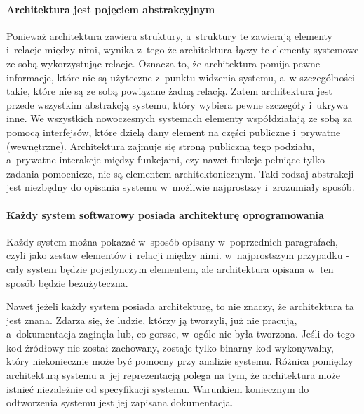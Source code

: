\paragraph{Architektura jest pojęciem abstrakcyjnym}
Ponieważ architektura zawiera struktury, a~struktury te zawierają elementy i~relacje między nimi, wynika z~tego że architektura łączy te elementy systemowe ze sobą wykorzystując relacje. Oznacza to, że architektura pomija pewne informacje, które nie są użyteczne z~punktu widzenia systemu, a~w szczególności takie, które nie są ze sobą powiązane żadną relacją. Zatem architektura jest przede wszystkim abstrakcją systemu, który wybiera pewne szczegóły i~ukrywa inne. We wszystkich nowoczesnych systemach elementy współdziałają ze sobą za pomocą interfejsów, które dzielą dany element na części publiczne i~prywatne (wewnętrzne). Architektura zajmuje się stroną publiczną tego podziału, a~prywatne interakcje między funkcjami, czy nawet funkcje pełniące tylko zadania pomocnicze, nie są elementem architektonicznym. Taki rodzaj abstrakcji jest niezbędny do opisania systemu w~możliwie najprostszy i~zrozumiały sposób.

\paragraph{Każdy system softwarowy posiada architekturę oprogramowania}
Każdy system można pokazać w~sposób opisany w~poprzednich paragrafach, czyli jako zestaw elementów i~relacji między nimi. w~najprostszym przypadku - cały system będzie pojedynczym elementem, ale architektura opisana w~ten sposób będzie bezużyteczna.

Nawet jeżeli każdy system posiada architekturę, to nie znaczy, że architektura ta jest znana. Zdarza się, że ludzie, którzy ją tworzyli, już nie pracują, a~dokumentacja zaginęła lub, co gorsze, w~ogóle nie była tworzona. Jeśli do tego kod źródłowy nie został zachowany, zostaje tylko binarny kod wykonywalny, który niekoniecznie może być pomocny przy analizie systemu.
Różnica pomiędzy architekturą systemu a~jej reprezentacją polega na tym, że architektura może istnieć niezależnie od specyfikacji systemu.  Warunkiem koniecznym do odtworzenia systemu jest jej zapisana dokumentacja.

